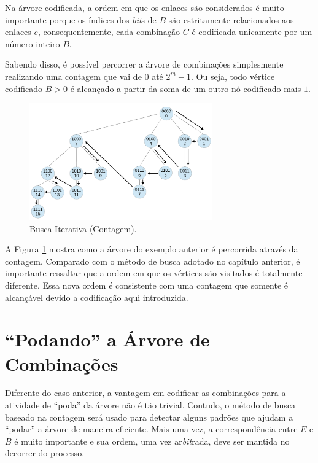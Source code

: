 Na árvore codificada, a ordem em que os enlaces são considerados é muito importante porque os índices dos {\it bit}s de $B$ são estritamente relacionados aos enlaces $e$, consequentemente, cada combinação $C$ é codificada unicamente por um número inteiro $B$.

Sabendo disso, é possível percorrer a árvore de combinações simplesmente realizando uma contagem que vai de 0 até $2^m -1$. Ou seja, todo vértice codificado $B>0$ é alcançado a partir da soma de um outro nó codificado mais $1$.

\begin{figure}[htb]
\centering
\includegraphics[width=0.7\textwidth]{figs/buscaiterativa}
\caption[Busca Iterativa (Contagem).]
{Busca Iterativa (Contagem).}
\label{fig:buscaiterativa}
\end{figure}

A Figura \ref{fig:buscaiterativa} mostra como a árvore do exemplo anterior é percorrida através da contagem. Comparado com o método de busca adotado no capítulo anterior, é importante ressaltar que a ordem em que os vértices são visitados é totalmente diferente. Essa nova ordem é consistente com uma contagem que somente é alcançável devido a codificação aqui introduzida.

\section{``Podando'' a Árvore de Combinações}
\label{section:saltos}

Diferente do caso anterior, a vantagem em codificar as combinações para a atividade de ``poda'' da árvore não é tão trivial. Contudo, o método de busca baseado na contagem será usado para detectar alguns padrões que ajudam a ``podar'' a árvore de maneira eficiente. Mais uma vez, a correspondência entre $E$ e $B$ é muito importante e sua ordem, uma vez ar{\it bit}rada, deve ser mantida no decorrer do processo. 

